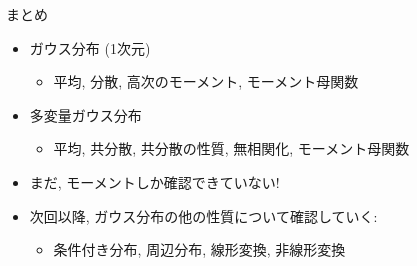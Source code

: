 \documentclass[dvipdfmx,notheorems,t]{beamer}
\begin{document}
\begin{frame}{まとめ}
\begin{itemize}
  \item ガウス分布 (1次元)
  \begin{itemize}
    \item 平均, 分散, 高次のモーメント, モーメント母関数
  \end{itemize}
  \item 多変量ガウス分布
  \begin{itemize}
    \item 平均, 共分散, 共分散の性質, 無相関化, モーメント母関数
  \end{itemize}
  \item まだ, モーメントしか確認できていない!
  \item 次回以降, ガウス分布の他の性質について確認していく:
  \begin{itemize}
    \item 条件付き分布, 周辺分布, 線形変換, 非線形変換
  \end{itemize}
\end{itemize}
\end{frame}
\end{document}
